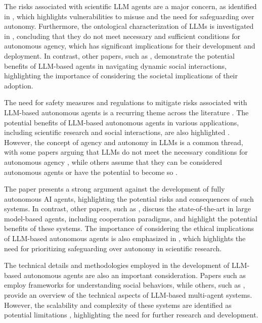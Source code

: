 \documentclass[conference]{IEEEtran}
\begin{document}
The risks associated with scientific LLM agents are a major concern, as identified in \cite{2402.04247}, which highlights vulnerabilities to misuse and the need for safeguarding over autonomy. Furthermore, the ontological characterization of LLMs is investigated in \cite{2407.10735}, concluding that they do not meet necessary and sufficient conditions for autonomous agency, which has significant implications for their development and deployment. In contrast, other papers, such as \cite{2310.14985}, demonstrate the potential benefits of LLM-based agents in navigating dynamic social interactions, highlighting the importance of considering the societal implications of their adoption.

The need for safety measures and regulations to mitigate risks associated with LLM-based autonomous agents is a recurring theme across the literature \cite{2402.04247, 2407.10735}. The potential benefits of LLM-based autonomous agents in various applications, including scientific research and social interactions, are also highlighted \cite{2411.14033, 2308.11432, 2310.14985}. However, the concept of agency and autonomy in LLMs is a common thread, with some papers arguing that LLMs do not meet the necessary conditions for autonomous agency \cite{2407.10735}, while others assume that they can be considered autonomous agents or have the potential to become so \cite{2411.14033, 2308.11432}.

The paper \cite{2502.02649} presents a strong argument against the development of fully autonomous AI agents, highlighting the potential risks and consequences of such systems. In contrast, other papers, such as \cite{2409.14457}, discuss the state-of-the-art in large model-based agents, including cooperation paradigms, and highlight the potential benefits of these systems. The importance of considering the ethical implications of LLM-based autonomous agents is also emphasized in \cite{2402.04247}, which highlights the need for prioritizing safeguarding over autonomy in scientific research.

The technical details and methodologies employed in the development of LLM-based autonomous agents are also an important consideration. Papers such as \cite{2310.14985} employ frameworks for understanding social behaviors, while others, such as \cite{2411.14033}, provide an overview of the technical aspects of LLM-based multi-agent systems. However, the scalability and complexity of these systems are identified as potential limitations \cite{2411.14033}, highlighting the need for further research and development.
\end{document}

